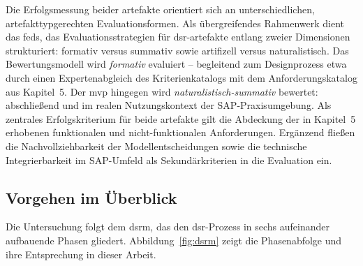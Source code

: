 Die Erfolgsmessung beider \gls{artefakt}e orientiert sich an unterschiedlichen, artefakttypgerechten Evaluationsformen.
Als übergreifendes Rahmenwerk dient das \gls{feds}, das Evaluationsstrategien für \gls{dsr}-\gls{artefakt}e entlang zweier Dimensionen strukturiert: formativ versus summativ sowie artifizell versus naturalistisch.
Das Bewertungsmodell wird \textit{formativ} evaluiert -- begleitend zum Designprozess etwa durch einen Expertenabgleich des Kriterienkatalogs mit dem Anforderungskatalog aus Kapitel~5.
Der \gls{mvp} hingegen wird \textit{naturalistisch-summativ} bewertet: abschließend und im realen Nutzungskontext der SAP-Praxisumgebung.
Als zentrales Erfolgskriterium für beide \gls{artefakt}e gilt die Abdeckung der in Kapitel~5 erhobenen funktionalen und nicht-funktionalen Anforderungen.
Ergänzend fließen die Nachvollziehbarkeit der Modellentscheidungen sowie die technische Integrierbarkeit im SAP-Umfeld als Sekundärkriterien in die Evaluation ein.

\subsection{Vorgehen im Überblick}
\label{sec:vorgehen}

Die Untersuchung folgt dem \gls{dsrm}, das den \gls{dsr}-Prozess in sechs aufeinander aufbauende Phasen gliedert.
Abbildung~\ref{fig:dsrm} zeigt die Phasenabfolge und ihre Entsprechung in dieser Arbeit.

